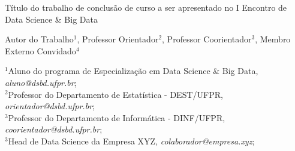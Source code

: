 \documentclass[portrait, 24pt, final]{sciposter}
\begin{document}


\vspace{10cm}

\noindent
\begin{minipage}[c][10cm][c]{0.75\textwidth}

  \vspace{6ex}
  {\Huge
    Título do trabalho de conclusão de curso a ser apresentado
    no I Encontro de Data Science \& Big Data
  }

  \vspace{1ex}
  {\Large
    Autor do Trabalho$^1$,
    Professor Orientador$^2$,
    Professor Coorientador$^3$,
    Membro Externo Convidado$^4$
  }

  \vspace{1ex}
  $^1${Aluno do programa de Especialização em Data Science \& Big Data, {\it aluno@dsbd.ufpr.br}};\\
  $^2${Professor do Departamento de Estatística - DEST/UFPR, {\it orientador@dsbd.ufpr.br}};\\
  $^3${Professor do Departamento de Informática - DINF/UFPR, {\it coorientador@dsbd.ufpr.br}};\\
  $^3${Head de Data Science da Empresa XYZ, {\it colaborador@empresa.xyz}};

\end{minipage}

\vspace{3cm}

\end{document}
